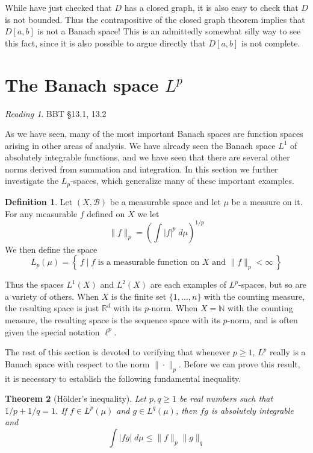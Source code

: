 \documentclass[11pt,oneside]{amsbook}
\newcommand{\set}[1]{\left\{\,#1\,\right\}}
\newcommand{\NN}{{\mathbb N}}
\newcommand{\RR}{{\mathbb R}}
\theoremstyle{definition}
\theoremstyle{plain}
\newtheorem{thm}{Theorem}[section]
\theoremstyle{definition}
\newtheorem{defn}[thm]{Definition}
\theoremstyle{remark}
\newtheorem*{reading}{Reading}
\numberwithin{equation}{section}
\numberwithin{figure}{section}
\begin{document}
While have just checked that $D$ has a closed graph, it is also easy to check that $D$ is not bounded. Thus the contrapositive of the closed graph theorem implies that $D[a,b]$ is not a Banach space! This is an admittedly somewhat silly way to see this fact, since it is also possible to argue directly that $D[a,b]$ is not complete.

\newpage
\section{The Banach space $L^p$}

\begin{reading}
  BBT \S 13.1, 13.2
\end{reading}

As we have seen, many of the most important Banach spaces are function spaces arising in other areas of analysis. We have already seen the Banach space $L^1$ of absolutely integrable functions, and we have seen that there are several other norms derived from summation and integration. In this section we further investigate the $L_p$-spaces, which generalize many of these important examples.

\begin{defn}
  Let $(X,\mathcal B)$ be a measurable space and let $\mu$ be a measure on it. For any measurable $f$ defined on $X$ we let
  \[\|f\|_p=\left(\int|f|^p\;d\mu\right)^{1/p}
  \]
  We then define the space
  \[L_p(\mu)=\set{f\mid\text{$f$ is a measurable function on $X$ and } \|f\|_p<\infty}
  \]
\end{defn}

Thus the spaces $L^1(X)$ and $L^2(X)$ are each examples of $L^p$-spaces, but so are a variety of others. When $X$ is the finite set $\{1,\ldots,n\}$ with the counting measure, the resulting space is just $\RR^d$ with its $p$-norm. When $X=\NN$ with the counting measure, the resulting space is the sequence space with its $p$-norm, and is often given the special notation $\ell^p$.

The rest of this section is devoted to verifying that whenever $p\geq1$, $L^p$ really is a Banach space with respect to the norm $\|\cdot\|_p$. Before we can prove this result, it is necessary to establish the following fundamental inequality.

\begin{thm}[H\"older's inequality]
  Let $p,q\geq1$ be real numbers such that $1/p+1/q=1$. If $f\in L^p(\mu)$ and $g\in L^q(\mu)$, then $fg$ is absolutely integrable and
  \[\int|fg|\;d\mu\leq\|f\|_p\|g\|_q
  \]
\end{thm}
\end{document}
